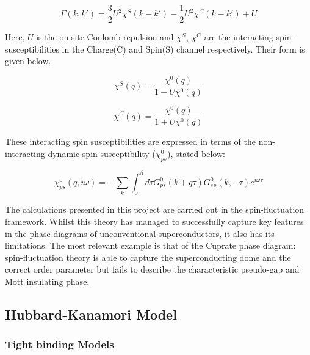 \documentclass[11pt]{article}
\begin{document}
\begin{equation}\label{Pairing interaction SF}
    \Gamma(k,k') = \frac{3}{2} U^2 \chi^S(k-k') -\frac{1}{2}U^2 \chi^C(k-k') + U
\end{equation} 

\noindent Here, $U$ is the on-site Coulomb repulsion and $\chi^S$, $\chi^C$ are the interacting spin-susceptibilities in the Charge(C) and Spin(S) channel respectively\cite{migdal1958interaction}. Their form is given below.

\begin{equation}
    \chi^S(q) = \frac{\chi^0(q)}{1 - U \chi^0 (q)}
\end{equation}

\begin{equation}
    \chi^C(q) = \frac{\chi^0(q)}{1 + U \chi^0 (q)}
\end{equation}

\noindent These interacting spin susceptibilities are expressed in terms of the non-interacting dynamic spin susceptibility ($\chi_{ps}^0$)\cite{moriya2000spin}, stated below: 

\begin{equation}\label{chi 0}
    \chi_{ps}^0(q, i \omega) = -\sum_{k} \int_{0}^{\beta} d\tau G^0_{ps}(k+q \tau) G^0_{sp}(k, -\tau)e^{i\omega \tau}
\end{equation} 

\noindent The calculations presented in this project are carried out in the spin-fluctuation framework. 
Whilst this theory has managed to successfully capture key features in the phase diagrams of unconventional superconductors, it also has its limitations.
The most relevant example is that of the Cuprate phase diagram:
spin-fluctuation theory is able to capture the superconducting dome and the correct order parameter \cite{moriya2006developments, scalapino1995case} 
but fails
to describe the characteristic pseudo-gap and Mott insulating phase\cite{timusk1999pseudogap}.


\subsection{Hubbard-Kanamori Model}

\subsubsection{Tight binding Models}
\end{document}
